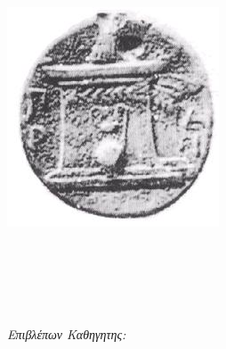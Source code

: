 \documentclass[11pt, a4paper, oneside]{Thesis} %
\begin{document}
\begin{titlepage}

\begin{center}

 \begin{minipage}{0.6\textwidth}
\begin{flushright} 
  \textsc{\LARGE \univname}\\[0.5cm] %
  \textsc{\LARGE \deptname}\\[1.5cm] %
\end{flushright}
\end{minipage}
\begin{minipage}{0.3\textwidth}
\begin{flushright} 
 \includegraphics[scale=0.35]{Figures/logo.jpg}
\end{flushright}
\end{minipage}


\vspace*{50pt}
\textsc{\Large \degreename}\\[0.2cm] %

\HRule \\[0.4cm] %
{\huge \bfseries \ttitle}\\[0.4cm] %
\HRule \\[1.5cm] %
 
\begin{minipage}{0.4\textwidth}
\begin{flushleft} \large
\textbf{\LARGE
\href{https://github.com/arischmod/}{\authornames} %
}
\end{flushleft}
\end{minipage}
\begin{minipage}{0.5\textwidth}
\begin{flushright} \large
\emph{Επιβλέπων Καθηγητης:} \\
\href{http://galaxy.hua.gr/~varlamis/index.php?cat=news}{\supname}\\[1.0cm] %


\end{flushright}
\end{minipage}
\end{center}
\end{titlepage}
\end{document}
